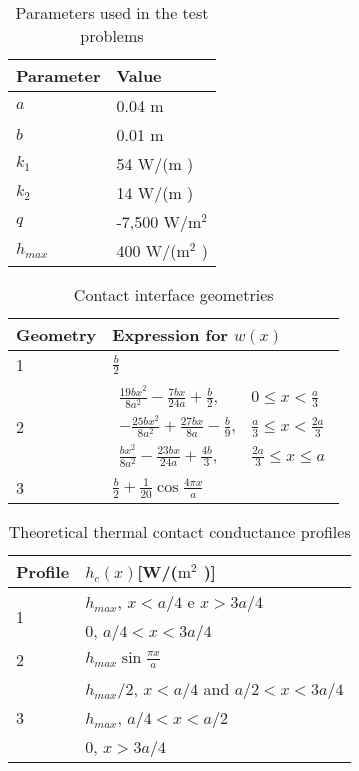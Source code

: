 \documentclass[12pt]{CHT-20}
\begin{document}
\begin{table}[H]
	\centering
	\caption{Parameters used in the test problems}
	\begin{tabular}{|l|l|}
		\hline
		\textbf{Parameter} & \textbf{Value}  \\ \hline
		$a$       & 0.04 m   \\ \hline
		$b$       & 0.01 m     \\ \hline
		$k_1$     & 54 W/(m \celsius)  \\ \hline
		$k_2$     & 14 W/(m \celsius) \\ \hline
		$q$       & -7,500 W/$\text{m}^2$ \\ \hline
		$h_{max}$       & 400 W/($\text{m}^2$ \celsius) \\ \hline
	\end{tabular}		
	\label{tabela_params}
\end{table}

\begin{table}[H]
	\centering
	\caption{Contact interface geometries}
	\begin{tabular}{|l|l|}
		\hline 
		\textbf{Geometry} & \textbf{Expression for} $w(x)$    \\ \hline
		1       & $\frac{b}{2}$   \\ \hline
		2       & $\begin{array}{ll}
		\frac{19bx^2}{8a^2}-\frac{7bx}{24a}+\frac{b}{2}, &  0 \le x < \frac{a}{3} \\
		-\frac{25bx^2}{8a^2}+\frac{27bx}{8a}-\frac{b}{9}, &  \frac{a}{3} \le x < \frac{2a}{3} \\ 
		\frac{bx^2}{8a^2}-\frac{23bx}{24a}+\frac{4b}{3}, &  \frac{2a}{3} \le x \le a
		\end{array}$     \\ \hline
		3       & $ \frac{b}{2} + \frac{1}{20} \cos\frac{4 \pi  x}{a}$ \\ \hline
	\end{tabular}			
	\label{tabela_interfaces}
\end{table}

\begin{table}[H]
	\centering
	\caption{Theoretical thermal contact conductance profiles}
	\begin{tabular}{|l|l|}
		\hline
		\textbf{Profile} & $h_c(x)$[W/($\text{m}^2$ \celsius)]  \\ \hline
		\multirow{2}{*}{1} & $h_{max}$, $x < a/4$ e $x > 3a/4$ \\ & 0, $a/4 < x < 3a/4$ \\ \hline
		2 & $h_{max}\sin\frac{\pi x}{a}$ \\ \hline
		\multirow{3}{*}{3} & $h_{max}/2$, $x < a/4$ and $a/2 < x < 3a/4$ \\ & $h_{max}$, $a/4 < x < a/2$ \\ & 0, $ x > 3a/4$
		\\ \hline
	\end{tabular}			
	\label{tabela_ctc}
\end{table}
\end{document}
